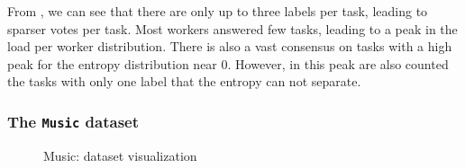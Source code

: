 From , we can see that there are only up to three labels per task, leading to sparser votes per task.
Most workers answered few tasks, leading to a peak in the load per worker distribution.
There is also a vast consensus on tasks with a high peak for the entropy distribution near $0$. However, in this peak are also counted the tasks with only one label that the entropy can not separate.

\subsubsection{The \texttt{Music} dataset}
\label{subsubsec:music}
\begin{figure}[thb]
    \centering
    \hfill
    \hfill
    \caption{Music: dataset visualization}
    \label{fig:Music_dataset_visualization}
\end{figure}

